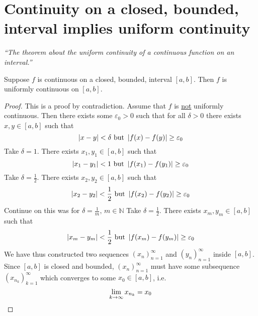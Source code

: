 \documentclass[12pt]{report}
\begin{document}
    \section{Continuity on a closed, bounded, interval implies uniform continuity}
    \textit{``The theorem about the uniform continuity of a continuous function on an interval.''} \vspace{3mm}
    \begin{theorem}
        Suppose \(f\) is continuous on a closed, bounded, interval \([a,b]\). Then \(f\) is uniformly continuous on \([a,b]\).
    \end{theorem}
    \begin{proof}
        This is a proof by contradiction. Assume that \(f\) is \underline{not} uniformly continuous. Then there exists some \(\varepsilon_0 > 0\) such that for all \(\delta > 0\) there exists \(x,y \in [a,b]\) such that
        \[\left| x-y \right| < \delta \text{ but } \left| f(x) - f(y) \right| \geq \varepsilon_0\]
        Take \(\delta = 1\). There exists \(x_1, y_1 \in  [a,b]\) such that 
        \[\left| x_1 - y_1 \right| < 1 \text{ but } \left| f(x_1) - f(y_1) \right| \geq \varepsilon_0\]
        Take \(\delta = \frac{1}{2}\). There exists \(x_2, y_2 \in  [a,b]\) such that 
        \[\left| x_2 - y_2 \right| < \frac{1}{2} \text{ but } \left| f(x_2) - f(y_2) \right| \geq \varepsilon_0\]
        Continue on this was for \(\delta = \frac{1}{m}, \, m \in \mathbb{N}\)
        Take \(\delta = \frac{1}{2}\). There exists \(x_m, y_m \in  [a,b]\) such that 
        \[\left| x_m - y_m \right| < \frac{1}{2} \text{ but } \left| f(x_m) - f(y_m) \right| \geq \varepsilon_0\]
        We have thus constructed two sequences \(\left(x_n\right)^\infty _{n=1}\) and \(\left(y_n\right)^\infty _{n=1}\) inside \([a,b]\). Since \([a,b]\) is closed and bounded, \(\left(x_n\right)^\infty _{n=1}\) must have some subsequence \(\left(x_{n_k}\right)^\infty _{k=1}\) which converges to some \(x_0 \in [a,b]\), i.e.
        \[\lim_{k \to \infty} x_{n_k} = x_0\]
        

\end{proof}
\end{document}
